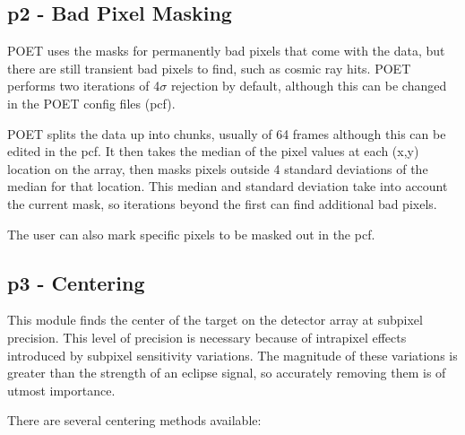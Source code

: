 \documentclass[letterpaper,12pt]{article}
\begin{document}
\subsection{p2 - Bad Pixel Masking}
POET uses the masks for permanently bad pixels that come with the data,
but there are still transient bad pixels to find, such as cosmic ray hits.
POET performs two iterations of 4$\sigma$ rejection by default, although
this can be changed in the POET config files (pcf).

POET splits the data up into chunks, usually of 64 frames although this
can be edited in the pcf. It then takes the median of the pixel values at
each (x,y) location on the array, then masks pixels outside 4 standard
deviations of the median for that location. This median and standard
deviation take into account the current mask, so iterations beyond the
first can find additional bad pixels.

The user can also mark specific pixels to be masked out in the pcf.

\subsection{p3 - Centering}
\label{sec:p3}
This module finds the center of the target on the detector array at
subpixel precision. This level of precision is necessary because of
intrapixel effects introduced by subpixel sensitivity variations. The
magnitude of these variations is greater than the strength of an
eclipse signal, so accurately removing them is of utmost importance.

There are several centering methods available:
\end{document}
